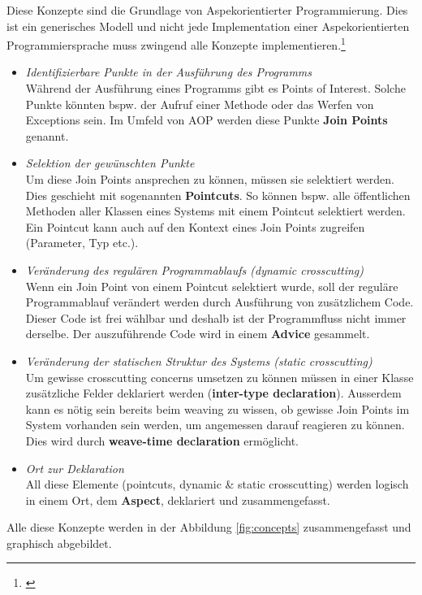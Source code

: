 Diese Konzepte sind die Grundlage von Aspekorientierter Programmierung. Dies ist ein generisches Modell und nicht jede Implementation einer Aspekorientierten Programmiersprache muss zwingend alle Konzepte implementieren.\footnote{\cite[p~58]{laddad:aspectj}}

\begin{itemize}
\item \textit{Identifizierbare Punkte in der Ausführung des Programms} \\ Während der Ausführung eines Programms gibt es Points of Interest. Solche Punkte könnten bspw. der Aufruf einer Methode oder das Werfen von Exceptions sein. Im Umfeld von AOP werden diese Punkte \textbf{Join Points} genannt. 
\item \textit{Selektion der gewünschten Punkte}\\ Um diese Join Points ansprechen zu können, müssen sie selektiert werden. Dies geschieht mit sogenannten \textbf{Pointcuts}. So können bspw. alle öffentlichen Methoden aller Klassen eines Systems mit einem Pointcut selektiert werden. Ein Pointcut kann auch auf den Kontext eines Join Points zugreifen (Parameter, Typ etc.).
\item \textit{Veränderung des regulären Programmablaufs (dynamic crosscutting)}\\
Wenn ein Join Point von einem Pointcut selektiert wurde, soll der reguläre Programmablauf verändert werden durch Ausführung von zusätzlichem Code. Dieser Code ist frei wählbar und deshalb ist der Programmfluss nicht immer derselbe. Der auszuführende Code wird in einem \textbf{Advice} gesammelt.
\item \textit{Veränderung der statischen Struktur des Systems (static crosscutting)}\\
Um gewisse crosscutting concerns umsetzen zu können müssen in einer Klasse zusätzliche Felder deklariert werden (\textbf{inter-type declaration}). Ausserdem kann es nötig sein bereits beim weaving zu wissen, ob gewisse Join Points im System vorhanden sein werden, um angemessen darauf reagieren zu können. Dies wird durch \textbf{weave-time declaration} ermöglicht.

\item \textit{Ort zur Deklaration}\\
All diese Elemente (pointcuts, dynamic \& static crosscutting) werden logisch in einem Ort, dem \textbf{Aspect}, deklariert und zusammengefasst.
\end{itemize}

Alle diese Konzepte werden in der Abbildung \ref{fig:concepts} zusammengefasst und graphisch abgebildet.

